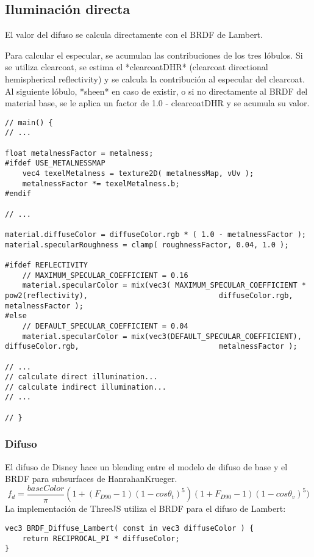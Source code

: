     \subsection{Iluminaci\'on directa}
        El valor del difuso se calcula directamente con el BRDF de Lambert.

        Para calcular el especular, se acumulan las contribuciones de los tres
        lóbulos. Si se utiliza clearcoat, se estima el *clearcoatDHR*
        (clearcoat directional hemispherical reflectivity) y se calcula la
        contribución al especular del clearcoat. Al siguiente lóbulo, *sheen* en
        caso de existir, o si no directamente al BRDF del material base, se le
        aplica un factor de 1.0 - clearcoatDHR y se acumula su valor.
        \singlespacing
        \begin{lstlisting}[caption=My Javascript Example]
// main() {
// ...

float metalnessFactor = metalness;
#ifdef USE_METALNESSMAP
    vec4 texelMetalness = texture2D( metalnessMap, vUv );
    metalnessFactor *= texelMetalness.b;
#endif

// ...

material.diffuseColor = diffuseColor.rgb * ( 1.0 - metalnessFactor );
material.specularRoughness = clamp( roughnessFactor, 0.04, 1.0 );

#ifdef REFLECTIVITY
    // MAXIMUM_SPECULAR_COEFFICIENT = 0.16
    material.specularColor = mix(vec3( MAXIMUM_SPECULAR_COEFFICIENT * pow2(reflectivity),                              diffuseColor.rgb, metalnessFactor );
#else
    // DEFAULT_SPECULAR_COEFFICIENT = 0.04
    material.specularColor = mix(vec3(DEFAULT_SPECULAR_COEFFICIENT), diffuseColor.rgb,                                metalnessFactor );

// ...
// calculate direct illumination...
// calculate indirect illumination...
// ...
                                    
// }
        \end{lstlisting}

        \subsubsection{Difuso}
            El difuso de Disney hace un blending entre el modelo de difuso de base y el BRDF para
            subsurfaces de HanrahanKrueger.
            $$
            f_d = \frac{baseColor}{\pi}(1 + (F_{D90} - 1) (1 - cos{\theta}_t)^5)(1 + F_{D90} - 1)
            (1 - cos\theta_v)^5)
            $$
            La implementación de ThreeJS utiliza el BRDF para el difuso de Lambert:
            \singlespacing
            \begin{lstlisting}[caption=My Javascript Example]
vec3 BRDF_Diffuse_Lambert( const in vec3 diffuseColor ) {
    return RECIPROCAL_PI * diffuseColor;
}
            \end{lstlisting}

